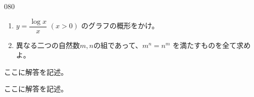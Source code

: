 \begin{thm}{080}{}{}
 \begin{enumerate}
  \item $y=\dfrac{\log x}{x}$ $(x>0)$ のグラフの概形をかけ。
  \item 異なる二つの自然数$m, n$の組であって、$m^n=n^m$ を満たすものを全て求めよ。
 \end{enumerate}
\end{thm}

ここに解答を記述。

ここに解答を記述。